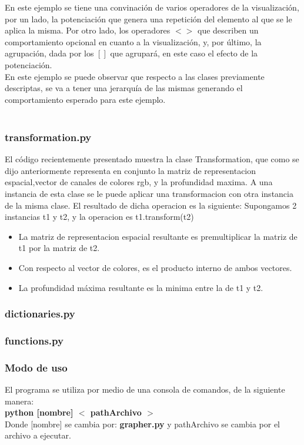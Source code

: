 En este ejemplo se tiene una convinaci\'on de varios operadores de la visualizaci\'on, por un lado, la potenciaci\'on que genera una repetici\'on del elemento al que se le aplica la misma. Por otro lado, los operadores $< >$ que describen un comportamiento opcional en cuanto a la visualizaci\'on, y, por \'ultimo, la agrupación, dada por los $[ ]$ que agrupar\'a, en este caso el efecto de la potenciaci\'on. \\
En este ejemplo se puede observar que respecto a las clases previamente descriptas, se va a tener una jerarqu\'ia de las mismas generando el comportamiento esperado para este ejemplo.\\
\\

\newpage
\subsubsection{transformation.py}



El c\'odigo recientemente presentado muestra la clase Transformation, que como se dijo anteriormente representa en conjunto la matriz de representacion espacial,vector de canales de colores rgb, y la profundidad maxima.
A una instancia de esta clase se le puede aplicar una transformacion con otra instancia de la misma clase. El resultado de dicha operacion es la siguiente:
Supongamos 2 instancias t1 y t2, y la operacion es t1.transform(t2)
\begin{itemize}
\item [] La matriz de representacion espacial resultante es premultiplicar la matriz de t1 por la matriz de t2. 
\item [] Con respecto al vector de colores, es el producto interno de ambos vectores.
\item [] La profundidad m\'axima resultante es la minima entre la de t1 y t2. 
\end{itemize}

\newpage
\subsubsection{dictionaries.py}


\newpage
\subsubsection{functions.py}



\newpage
\subsubsection{Modo de uso}
El programa se utiliza por medio de una consola de comandos, de la siguiente manera:\\
\textbf{ python [nombre] $<$ pathArchivo $>$} \\ 
Donde [nombre] se cambia por: \textbf{grapher.py}
y pathArchivo se cambia por el archivo a ejecutar.

